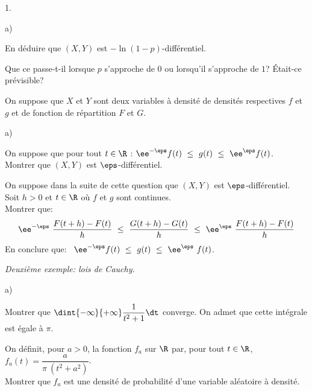\begin{noliste}{1.}
\begin{noliste}{a)}
    
    
    
    

  \item En déduire que $(X,Y)$ est $-\ln(1-p)$-différentiel.

    

  \item Que ce passe-t-il lorsque $p$ s'approche de $0$ ou lorsqu'il
    s'approche de $1$? Était-ce prévisible?

    
  \end{noliste}
  
\item On suppose que $X$ et $Y$ sont deux variables à densité de
  densités respectives $f$ et $g$ et de fonction de répartition $F$ et
  $G$.
  \begin{noliste}{a)}
    \setlength{\itemsep}{2mm} %
  \item On suppose que pour tout $t\in\R$ : $\ee^{-\eps} f(t) \ \leq \
    g(t) \ \leq \ \ee^{\eps}f(t)$.\\
    Montrer que $(X,Y)$ est $\eps$-différentiel.

  
\newpage
    

  \item On suppose dans la suite de cette question que $(X,Y)$ est
    $\eps$-différentiel.\\
    Soit $h>0$ et $t \in \R$ où $f$ et $g$ sont continues.\\[.2cm]
    Montrer que:
    \[
    \ee^{-\eps} \ \dfrac{F(t+h)-F(t)}{h} \ \leq \
    \dfrac{G(t+h)-G(t)}{h} \ \leq \ \ee^{\eps} \
    \dfrac{F(t+h)-F(t)}{h}
    \]
    En conclure que: \ $\ee^{-\eps} f(t) \ \leq \ g(t) \ \leq \
    \ee^{\eps} \ f(t)$.
  \end{noliste}

\item {\em Deuxième exemple: lois de Cauchy.}
  \begin{noliste}{a)}
    \setlength{\itemsep}{2mm} %
  \item Montrer que $\dint{-\infty}{+\infty} \dfrac{1}{t^2+1} \dt$
    converge. On admet que cette intégrale est égale à $\pi$.

    
    
    
    
    

  \item On définit, pour $a > 0$, la fonction $f_a$ sur $\R$ par, pour
    tout $t \in \R$, $f_a(t) = \dfrac{a}{\pi \ (t^2+a^2)}$.\\
    Montrer que $f_a$ est une densité de probabilité d'une variable
    aléatoire à densité.


\end{noliste}
\end{noliste}
